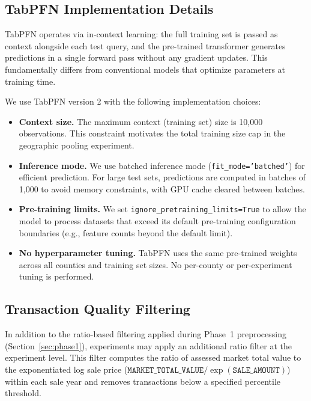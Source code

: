 \subsection{TabPFN Implementation Details}\label{app:tabpfn_details}

TabPFN operates via in-context learning: the full training set is passed as context alongside each test query, and the pre-trained transformer generates predictions in a single forward pass without any gradient updates. This fundamentally differs from conventional models that optimize parameters at training time.

We use TabPFN version 2 with the following implementation choices:

\begin{itemize}
    \item \textbf{Context size.} The maximum context (training set) size is 10,000 observations. This constraint motivates the total training size cap in the geographic pooling experiment.
    \item \textbf{Inference mode.} We use batched inference mode (\texttt{fit\_mode='batched'}) for efficient prediction. For large test sets, predictions are computed in batches of 1,000 to avoid memory constraints, with GPU cache cleared between batches.
    \item \textbf{Pre-training limits.} We set \texttt{ignore\_pretraining\_limits=True} to allow the model to process datasets that exceed its default pre-training configuration boundaries (e.g., feature counts beyond the default limit).
    \item \textbf{No hyperparameter tuning.} TabPFN uses the same pre-trained weights across all counties and training set sizes. No per-county or per-experiment tuning is performed.
\end{itemize}

\subsection{Transaction Quality Filtering}\label{app:ratio_filter}

In addition to the ratio-based filtering applied during Phase~1 preprocessing (Section~\ref{sec:phase1}), experiments may apply an additional ratio filter at the experiment level. This filter computes the ratio of assessed market total value to the exponentiated log sale price ($\texttt{MARKET\_TOTAL\_VALUE} / \exp(\texttt{SALE\_AMOUNT})$) within each sale year and removes transactions below a specified percentile threshold.

